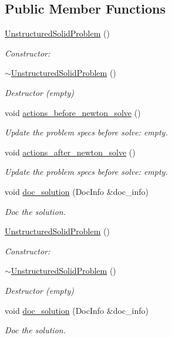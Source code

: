\subsection*{Public Member Functions}
\begin{DoxyCompactItemize}
\item 
\hyperlink{classUnstructuredSolidProblem_a18ce02b6e4bbc86403c9e1b32c095772}{Unstructured\+Solid\+Problem} ()
\begin{DoxyCompactList}\small\item\em Constructor\+: \end{DoxyCompactList}\item 
\hyperlink{classUnstructuredSolidProblem_a25fe105d949498bf8f7c15aff96a7d00}{$\sim$\+Unstructured\+Solid\+Problem} ()
\begin{DoxyCompactList}\small\item\em Destructor (empty) \end{DoxyCompactList}\item 
void \hyperlink{classUnstructuredSolidProblem_af8139cf00952aaf56cea69ec5859b742}{actions\+\_\+before\+\_\+newton\+\_\+solve} ()
\begin{DoxyCompactList}\small\item\em Update the problem specs before solve\+: empty. \end{DoxyCompactList}\item 
void \hyperlink{classUnstructuredSolidProblem_a57946bc2c0d083d74c3e9416f882f7c0}{actions\+\_\+after\+\_\+newton\+\_\+solve} ()
\begin{DoxyCompactList}\small\item\em Update the problem specs before solve\+: empty. \end{DoxyCompactList}\item 
void \hyperlink{classUnstructuredSolidProblem_ab3d66fd61b69d12b4f159d763fc44f15}{doc\+\_\+solution} (Doc\+Info \&doc\+\_\+info)
\begin{DoxyCompactList}\small\item\em Doc the solution. \end{DoxyCompactList}\item 
\hyperlink{classUnstructuredSolidProblem_a18ce02b6e4bbc86403c9e1b32c095772}{Unstructured\+Solid\+Problem} ()
\begin{DoxyCompactList}\small\item\em Constructor\+: \end{DoxyCompactList}\item 
\hyperlink{classUnstructuredSolidProblem_a25fe105d949498bf8f7c15aff96a7d00}{$\sim$\+Unstructured\+Solid\+Problem} ()
\begin{DoxyCompactList}\small\item\em Destructor (empty) \end{DoxyCompactList}\item 
void \hyperlink{classUnstructuredSolidProblem_ab3d66fd61b69d12b4f159d763fc44f15}{doc\+\_\+solution} (Doc\+Info \&doc\+\_\+info)
\begin{DoxyCompactList}\small\item\em Doc the solution. \end{DoxyCompactList}\end{DoxyCompactItemize}
